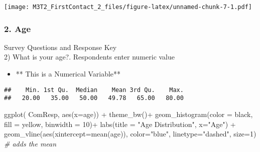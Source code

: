 \documentclass[
]{article}
\newenvironment{Shaded}{\begin{snugshade}}{\end{snugshade}}
\newcommand{\AttributeTok}[1]{\textcolor[rgb]{0.77,0.63,0.00}{#1}}
\newcommand{\CommentTok}[1]{\textcolor[rgb]{0.56,0.35,0.01}{\textit{#1}}}
\newcommand{\DecValTok}[1]{\textcolor[rgb]{0.00,0.00,0.81}{#1}}
\newcommand{\FunctionTok}[1]{\textcolor[rgb]{0.00,0.00,0.00}{#1}}
\newcommand{\NormalTok}[1]{#1}
\newcommand{\SpecialCharTok}[1]{\textcolor[rgb]{0.00,0.00,0.00}{#1}}
\newcommand{\StringTok}[1]{\textcolor[rgb]{0.31,0.60,0.02}{#1}}
\providecommand{\tightlist}{%
  \setlength{\itemsep}{0pt}\setlength{\parskip}{0pt}}
\begin{document}
\texttt{[image: M3T2\_FirstContact\_2\_files/figure-latex/unnamed-chunk-7-1.pdf]}

\hypertarget{age}{%
\subsubsection{2. Age}\label{age}}

Survey Questions and Response Key\\
2) What is your age?. Respondents enter numeric value

\begin{itemize}
\tightlist
\item
  ** This is a Numerical Variable**
\end{itemize}

\begin{Shaded}
\end{Shaded}

\begin{verbatim}
##    Min. 1st Qu.  Median    Mean 3rd Qu.    Max. 
##   20.00   35.00   50.00   49.78   65.00   80.00
\end{verbatim}

\begin{Shaded}
\begin{Highlighting}[]
\FunctionTok{ggplot}\NormalTok{( ComResp, }\FunctionTok{aes}\NormalTok{(}\AttributeTok{x=}\NormalTok{age)) }\SpecialCharTok{+} \FunctionTok{theme\_bw}\NormalTok{()}\SpecialCharTok{+}
  \FunctionTok{geom\_histogram}\NormalTok{(}\AttributeTok{color =} \StringTok{\textquotesingle{}black\textquotesingle{}}\NormalTok{, }\AttributeTok{fill =} \StringTok{\textquotesingle{}yellow\textquotesingle{}}\NormalTok{, }\AttributeTok{binwidth =} \DecValTok{10}\NormalTok{)}\SpecialCharTok{+}
  \FunctionTok{labs}\NormalTok{(}\AttributeTok{title =} \StringTok{"Age Distribution"}\NormalTok{, }\AttributeTok{x=}\StringTok{"Age"}\NormalTok{) }\SpecialCharTok{+}
  \FunctionTok{geom\_vline}\NormalTok{(}\FunctionTok{aes}\NormalTok{(}\AttributeTok{xintercept=}\FunctionTok{mean}\NormalTok{(age)), }\AttributeTok{color=}\StringTok{"blue"}\NormalTok{, }\AttributeTok{linetype=}\StringTok{"dashed"}\NormalTok{, }\AttributeTok{size=}\DecValTok{1}\NormalTok{)  }\CommentTok{\# adds the mean}
\end{Highlighting}
\end{Shaded}
\end{document}
